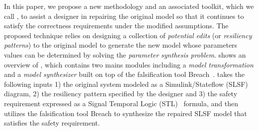 In this paper, we propose a new methodology and an associated toolkit, which we call \toolreaffirm, to assist a designer in repairing the original model so that it continues to satisfy the correctness requirements under the modified assumptions. %
%
The proposed technique relies on designing a collection of \emph{potential edits} (or \emph{resiliency patterns}) to the original model to generate the new model whose parameters values can be determined by solving the \emph{parameter synthesis problem}. 
%
%
%
 shows an overview of \toolreaffirm, which contains two mains modules including a \emph{model transformation} and a \emph{model synthesizer} built on top of the falsification tool Breach~\cite{donze2010breach}.
\toolreaffirm takes the following inputs 1) the original system modeled as a Simulink/Stateflow (SLSF) diagram, 2) the resiliency pattern specified by the designer and 3) the safety requirement expressed as a Signal Temporal Logic (STL)~\cite{maler2004monitoring} formula, and then utilizes the falsification tool Breach to synthesize the repaired SLSF model that satisfies the safety requirement.

%
%
%
%
%
%
%

